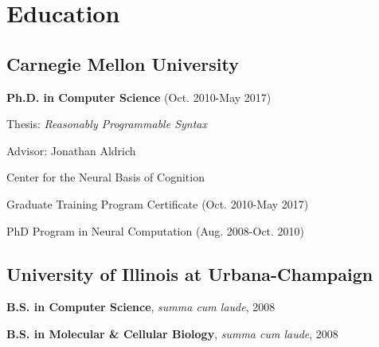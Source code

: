 \documentclass[10pt,letterpaper]{article}
\renewenvironment{itemize}{
  \begin{list}{}{
    \setlength{\leftmargin}{1.25em}
    \setlength{\itemsep}{0.25em}
    \setlength{\parskip}{0pt}
    \setlength{\parsep}{0.2em}
  }
}{
  \end{list}
}
\begin{document}
\section*{Education}

\subsection*{Carnegie Mellon University}

\begin{itemize}
  \item \textbf{Ph.D. in Computer Science} (Oct. 2010-May 2017)
        \begin{itemize}
          \item Thesis: \emph{Reasonably Programmable Syntax}
          \item Advisor: Jonathan Aldrich
        \end{itemize}
  \item Center for the Neural Basis of Cognition
        \begin{itemize}
          \item Graduate Training Program Certificate (Oct. 2010-May 2017)
          \item PhD Program in Neural Computation (Aug. 2008-Oct. 2010)
        \end{itemize}
\end{itemize}

\subsection*{University of Illinois at Urbana-Champaign}
\begin{itemize}
  \item \textbf{B.S. in Computer Science}, \emph{summa cum laude}, 2008
  \item \textbf{B.S. in Molecular \& Cellular Biology}, \emph{summa cum laude}, 2008
\end{itemize}
\end{document}
